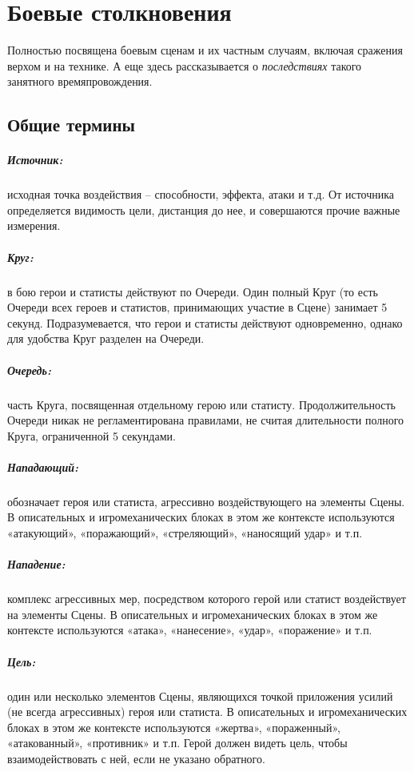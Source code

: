 \chapter{Боевые столкновения}
Полностью посвящена боевым сценам и их частным случаям, включая сражения верхом и на технике. А еще здесь рассказывается о \textit{последствиях} такого занятного времяпровождения.
\section{Общие термины}

\paragraph{Источник:} исходная точка воздействия – способности, эффекта, атаки и т.д. От источника определяется видимость цели, дистанция до нее, и совершаются прочие важные измерения. 
\paragraph{Круг:} в бою герои и статисты действуют по Очереди. Один полный Круг (то есть Очереди всех героев и статистов, принимающих участие в Сцене) занимает 5 секунд. Подразумевается, что герои и статисты действуют одновременно, однако для удобства Круг разделен на Очереди. 
\paragraph{Очередь:} часть Круга, посвященная отдельному герою или статисту. Продолжительность Очереди никак не регламентирована правилами, не считая длительности полного Круга, ограниченной 5 секундами.
\paragraph{Нападающий:} обозначает героя или статиста, агрессивно воздействующего на элементы Сцены. В описательных и игромеханических блоках в этом же контексте используются «атакующий», «поражающий», «стреляющий», «наносящий удар» и т.п.
\paragraph{Нападение:} комплекс агрессивных мер, посредством которого герой или статист воздействует на элементы Сцены. В описательных и игромеханических блоках в этом же контексте используются «атака», «нанесение», «удар», «поражение» и т.п.
\paragraph{Цель:} один или несколько элементов Сцены, являющихся точкой приложения усилий (не всегда агрессивных) героя или статиста. В описательных и игромеханических блоках в этом же контексте используются «жертва», «пораженный», «атакованный», «противник» и т.п. Герой должен видеть цель, чтобы взаимодействовать с ней, если не указано обратного.
